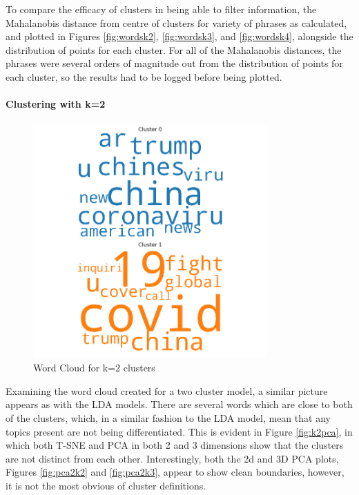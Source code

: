 To compare the efficacy of clusters in being able to filter information, the Mahalanobis distance from centre of clusters for variety of phrases as calculated, and plotted in Figures \ref{fig:wordsk2}, \ref{fig:wordsk3}, and \ref{fig:wordsk4}, alongside the distribution of points for each cluster. For all of the Mahalanobis distances, the phrases were several orders of magnitude out from the distribution of points for each cluster, so the results had to be logged before being plotted.  
\paragraph{Clustering with k=2}
\begin{figure}[H]
	\centering
	\includegraphics[width=0.8\textwidth]{images/kmeans_word_cloud_k=2.png}
	\caption{Word Cloud for k=2 clusters}
	\label{fig:wck2}
\end{figure}
Examining the word cloud created for a two cluster model, a similar picture appears as with the LDA models. There are several words which are close to both of the clusters, which, in a similar fashion to the LDA model, mean that any topics present are not being differentiated. This is evident in Figure \ref{fig:k2pca}, in which both T-SNE and PCA in both 2 and 3 dimensions show that the clusters are not distinct from each other. Interestingly, both the 2d and 3D PCA plots, Figures \ref{fig:pca2k2} and \ref{fig:pca2k3}, appear to show clean boundaries, however, it is not the most obvious of cluster definitions.

